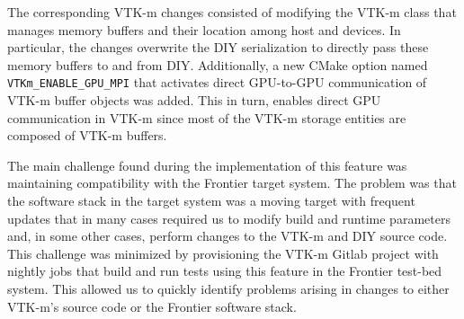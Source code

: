 The corresponding VTK-m changes consisted of modifying the VTK-m class that manages memory buffers and their location among host and devices.
In particular, the changes overwrite the DIY serialization to directly pass these memory buffers to and from DIY.
Additionally, a new CMake option named \texttt{VTKm\_ENABLE\_GPU\_MPI} that activates direct GPU-to-GPU communication of VTK-m buffer objects was added.
This in turn, enables direct GPU communication in VTK-m since most of the VTK-m storage entities are composed of VTK-m buffers. 

The main challenge found during the implementation of this feature was maintaining compatibility with the Frontier target system.
The problem was that the software stack in the target system was a moving target with frequent updates that in many cases required us to modify build and runtime parameters and, in some other cases, perform changes to the VTK-m and DIY source code.
This challenge was minimized by provisioning the VTK-m Gitlab project with nightly jobs that build and run tests using this feature in the Frontier test-bed system.
This allowed us to quickly identify problems arising in changes to either VTK-m's source code or the Frontier software stack.

